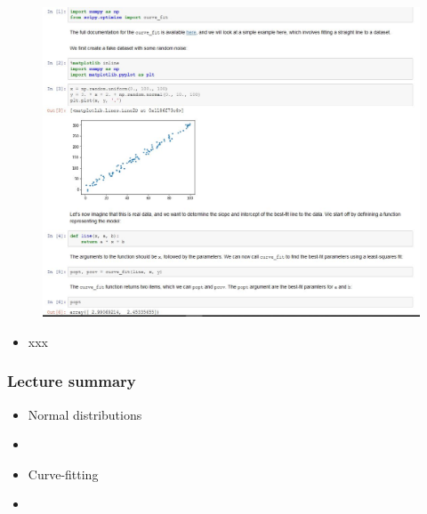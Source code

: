 \documentclass[english,14pt]{beamer}
\begin{document}

\begin{frame}[fragile]

\frametitle{}

\begin{figure}[ht]
	\centering
	\includegraphics[width=\textwidth]{figures/linearfitscratch}
\end{figure}


\begin{itemize}
	\item xxx
\end{itemize}

\end{frame}



\begin{frame}[fragile]

\frametitle{Lecture summary}
\begin{itemize}
	\item Normal distributions
	\item[]
	
	\item Curve-fitting
	\item[]
	
\end{itemize}

\end{frame}
\end{document}
